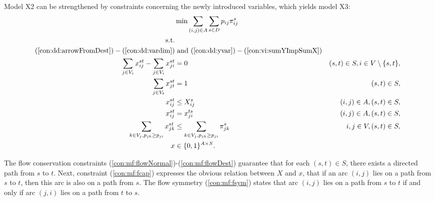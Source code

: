 Model X2 can be strengthened by constraints concerning the newly introduced variables, which yields model X3: 
\newline
\newline
\begin{subequations}\label{eq:smt-x2}
\begin{align}
\label{objective:mf} \makebox[0pt][l]{$\displaystyle{} \min \sum\limits_{(i,j) \in A} \sum\limits_{s \in D} p_{ij} \pi^s_{ij} $}\\
\text{s.t.} \notag \\
(\ref{con:dd:arrowFromDest}) - (\ref{con:dd:vardim}) &\text{ and }(\ref{con:dd:yvar}) - (\ref{con:vi:sumYImpSumX}) \notag\\
\label{con:mf:flowNormal} \sum\limits_{\substack{ j\in V_i}}x^{st}_{ij}-\sum\limits_{\substack{j\in V_i }}x^{st}_{ji} & = 0 & (s,t)\in S, i\in V\setminus\{s,t\},\\
\label{con:mf:flowDest} \sum\limits_{\substack{j\in V_t}}x^{st}_{jt}    & = 1  & (s,t)\in S,\\
\label{con:mf:fcap} x^{st}_{ij} &\leq X^{s}_{ij}& (i,j)\in A, (s,t)\in S,\\
\label{con:mf:fsym} x^{st}_{ij} &=  x^{ts}_{ji}& (i,j)\in A, (s,t)\in S,\\ 
\label{con:vi:sumFImpSumY} \sum\limits_{k\in V_j, p_{jk}\geq p_{ji}}x^{st}_{jk} & \leq \sum\limits_{k\in V_j, p_{jk}\geq p_{ji}}  \pi^{s}_{jk} & i,j\in V, (s,t)\in S,\\
\label{con:mf:xydim} x&\in\{0,1\}^{A\times S}. 
\end{align}~
\end{subequations}

The flow conservation constraints (\ref{con:mf:flowNormal})-(\ref{con:mf:flowDest}) guarantee that for each $(s,t)\in S$, there exists a directed path from $s$ to $t$.
Next, constraint (\ref{con:mf:fcap}) expresses the obvious relation between $X$ and $x$, that if an arc $(i,j)$ lies on a path from $s$ to $t$, then this arc is also on a path from $s$.
The flow symmetry (\ref{con:mf:fsym}) states that arc $(i,j)$ lies on a path from $s$ to $t$ if and only if arc $(j,i)$ lies on a path from $t$ to $s$.

